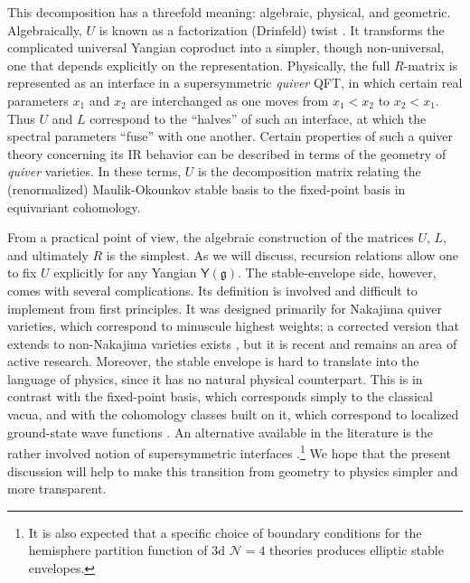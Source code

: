 \documentclass[10pt]{article}
\theoremstyle{definition}
\def\fg{\mathfrak{g}}
\def\myY{{\mathsf{Y}}}
\numberwithin{equation}{section}
\begin{document}
This decomposition has a threefold meaning: algebraic, physical, and geometric.
Algebraically, $U$ is known as a factorization (Drinfeld) twist \cite{drinfeld1990quasi,Pfeiffer2000Yangian,Terras2000,Pfeiffer2001QuantumAffine,Albert2000XYZ,Yang2004,Torrielli2023,Maillet2000}.
It transforms the complicated universal Yangian coproduct into a simpler, though non-universal, one that depends explicitly on the representation.
Physically, the full $R$-matrix is represented as an interface \cite{Brunner:2007Btype,Brunner:2008Defects,Gaiotto:2015aoa,Galakhov:2020upa,Dedushenko:2021mds,Brunner:2021ulc,Dedushenko:2023qjq,Haouzi:2023doo,Khan:2024yiy,Cordova:2024iti,Brunner:2024quk} in a supersymmetric \emph{quiver} QFT, in which certain real parameters $x_1$ and $x_2$ are interchanged as one moves from $x_1<x_2$ to $x_2<x_1$.
Thus $U$ and $L$ correspond to the ``halves'' of such an interface, at which the spectral parameters ``fuse'' with one another.
Certain properties of such a quiver theory concerning its IR behavior can be described in terms of the geometry of \emph{quiver} varieties.
In these terms, $U$ is the decomposition matrix relating the (renormalized) Maulik-Okounkov stable basis \cite{MO} to the fixed-point basis in equivariant cohomology.

From a practical point of view, the algebraic construction of the matrices $U$, $L$, and ultimately $R$ is the simplest.
As we will discuss, recursion relations allow one to fix $U$ explicitly for any Yangian $\myY(\fg)$.
The stable-envelope side, however, comes with several complications.
Its definition is involved and difficult to implement from first principles.
It was designed primarily for Nakajima quiver varieties, which correspond to minuscule highest weights; a corrected version that extends to non-Nakajima varieties exists \cite{Ishtiaque:2023acr,Cao:2025yng,Cao:2026pir,Cao:2026vwf}, but it is recent and remains an area of active research.
Moreover, the stable envelope is hard to translate into the language of physics, since it has no natural physical counterpart.
This is in contrast with the fixed-point basis, which corresponds simply to the classical vacua, and with the cohomology classes built on it, which correspond to localized ground-state wave functions \cite{Witten:1982im}.
An alternative available in the literature is the rather involved notion of supersymmetric interfaces \cite{Dedushenko:2021mds,Bullimore:2017lwu}.\footnote{It is also expected \cite{Crew:2020psc} that a specific choice of boundary conditions for the hemisphere partition function of 3d $\mathcal{N}=4$ theories produces elliptic stable envelopes.}
We hope that the present discussion will help to make this transition from geometry to physics simpler and more transparent.
\end{document}
